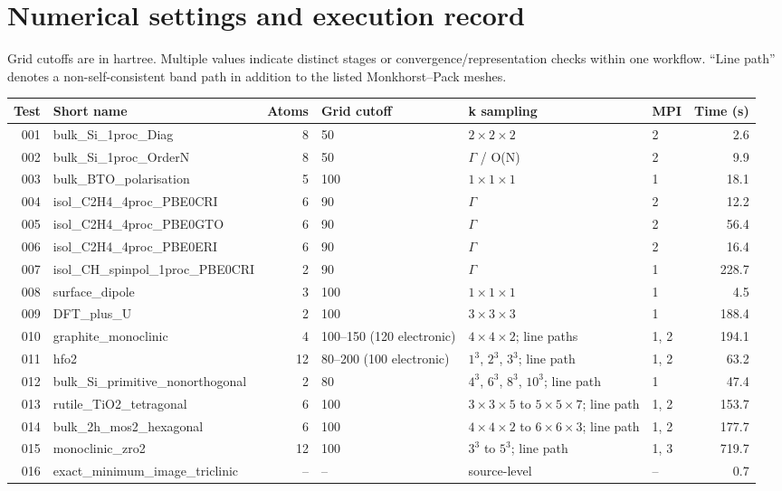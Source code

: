 \documentclass[aps,prb,preprint,superscriptaddress,longbibliography,floatfix]{revtex4-2}
\begin{document}
\section*{Numerical settings and execution record}
Grid cutoffs are in hartree. Multiple values indicate distinct stages or convergence/representation checks within one workflow. ``Line path'' denotes a non-self-consistent band path in addition to the listed Monkhorst--Pack meshes.\cite{Monkhorst1976}
\begin{center}\scriptsize
\begin{tabular}{r p{40mm} r p{25mm} p{42mm} p{10mm} r}
\toprule Test & Short name & Atoms & Grid cutoff & k sampling & MPI & Time (s) \\
\midrule
001 & bulk\_\allowbreak{}Si\_\allowbreak{}1proc\_\allowbreak{}Diag & 8 & 50 & $2\times2\times2$ & 2 & 2.6 \\
002 & bulk\_\allowbreak{}Si\_\allowbreak{}1proc\_\allowbreak{}OrderN & 8 & 50 & $\Gamma$ / O(N) & 2 & 9.9 \\
003 & bulk\_\allowbreak{}BTO\_\allowbreak{}polarisation & 5 & 100 & $1\times1\times1$ & 1 & 18.1 \\
004 & isol\_\allowbreak{}C2H4\_\allowbreak{}4proc\_\allowbreak{}PBE0CRI & 6 & 90 & $\Gamma$ & 2 & 12.2 \\
005 & isol\_\allowbreak{}C2H4\_\allowbreak{}4proc\_\allowbreak{}PBE0GTO & 6 & 90 & $\Gamma$ & 2 & 56.4 \\
006 & isol\_\allowbreak{}C2H4\_\allowbreak{}4proc\_\allowbreak{}PBE0ERI & 6 & 90 & $\Gamma$ & 2 & 16.4 \\
007 & isol\_\allowbreak{}CH\_\allowbreak{}spinpol\_\allowbreak{}1proc\_\allowbreak{}PBE0CRI & 2 & 90 & $\Gamma$ & 1 & 228.7 \\
008 & surface\_\allowbreak{}dipole & 3 & 100 & $1\times1\times1$ & 1 & 4.5 \\
009 & DFT\_\allowbreak{}plus\_\allowbreak{}U & 2 & 100 & $3\times3\times3$ & 1 & 188.4 \\
010 & graphite\_\allowbreak{}monoclinic & 4 & 100--150 (120 electronic) & $4\times4\times2$; line paths & 1, 2 & 194.1 \\
011 & hfo2 & 12 & 80--200 (100 electronic) & $1^3$, $2^3$, $3^3$; line path & 1, 2 & 63.2 \\
012 & bulk\_\allowbreak{}Si\_\allowbreak{}primitive\_\allowbreak{}nonorthogonal & 2 & 80 & $4^3$, $6^3$, $8^3$, $10^3$; line path & 1 & 47.4 \\
013 & rutile\_\allowbreak{}TiO2\_\allowbreak{}tetragonal & 6 & 100 & $3\times3\times5$ to $5\times5\times7$; line path & 1, 2 & 153.7 \\
014 & bulk\_\allowbreak{}2h\_\allowbreak{}mos2\_\allowbreak{}hexagonal & 6 & 100 & $4\times4\times2$ to $6\times6\times3$; line path & 1, 2 & 177.7 \\
015 & monoclinic\_\allowbreak{}zro2 & 12 & 100 & $3^3$ to $5^3$; line path & 1, 3 & 719.7 \\
016 & exact\_\allowbreak{}minimum\_\allowbreak{}image\_\allowbreak{}triclinic & -- & -- & source-level & -- & 0.7 \\
\bottomrule
\end{tabular}
\end{center}
\end{document}
